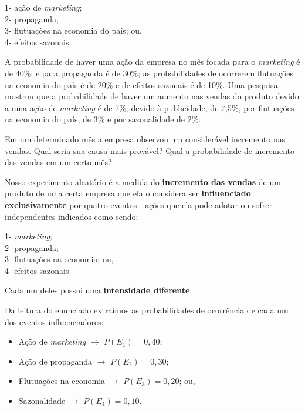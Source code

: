 \documentclass[
]{book}
\providecommand{\tightlist}{%
  \setlength{\itemsep}{0pt}\setlength{\parskip}{0pt}}
\begin{document}
\hfill\break

1- ação de \emph{marketing};\\
2- propaganda;\\
3- flutuações na economia do país; ou,\\
4- efeitos sazonais.

\hfill\break

A probabilidade de haver uma ação da empresa no mês focada para o \emph{marketing} é de 40\%; e para propaganda é de 30\%; as probabilidades de ocorrerem flutuações na economia do país é de 20\% e de efeitos sazonais é de 10\%. Uma pesquisa mostrou que a probabilidade de haver um aumento nas vendas do produto devido a uma ação de \emph{marketing} é de 7\%; devido à publicidade, de 7,5\%, por flutuações na economia do país, de 3\% e por sazonalidade de 2\%.

\hfill\break

Em um determinado mês a empresa observou um considerável incremento nas vendas. Qual seria sua causa mais provável? Qual a probabilidade de incremento das vendas em um certo mês?

\hfill\break

Nosso experimento aleatório é a medida do \textbf{incremento das vendas} de um produto de uma certa empresa que ela o considera ser \textbf{influenciado exclusivamente} por quatro eventos - ações que ela pode adotar ou sofrer - independentes indicados como sendo:

\hfill\break

1- \emph{marketing};\\
2- propaganda;\\
3- flutuações na economia; ou,\\
4- efeitos sazonais.

Cada um deles possui uma \textbf{intensidade diferente}.

\hfill\break

Da leitura do enunciado extraímos as probabilidades de ocorrência de cada um dos eventos influenciadores:

\hfill\break

\begin{itemize}
\tightlist
\item
  Ação de \emph{marketing} \(\rightarrow\) \(P(E_{1})=0,40\);\\
\item
  Ação de propaganda \(\rightarrow\) \(P(E_{2})=0,30\);\\
\item
  Flutuações na economia \(\rightarrow\) \(P(E_{3})=0,20\); ou,\\
\item
  Sazonalidade \(\rightarrow\) \(P(E_{4})=0,10\).
\end{itemize}
\end{document}
